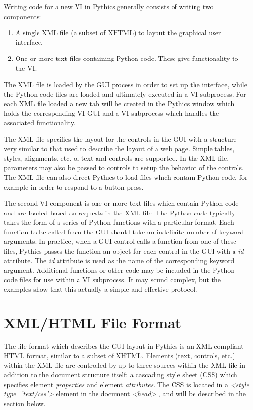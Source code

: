 \documentclass[letterpaper,10pt,english]{sphinxmanual}
\begin{document}
Writing code for a new VI in Pythics generally consists of writing two
components:
\begin{enumerate}
\item {} 
A single XML file (a subset of XHTML) to layout the graphical user interface.

\item {} 
One or more text files containing Python code. These give functionality to
the VI.

\end{enumerate}

The XML file is loaded by the GUI process in order to set up the interface,
while the Python code files are loaded and ultimately executed in a VI
subprocess. For each XML file loaded a new tab will be created in the
Pythics window which holds the corresponding VI GUI and a VI subprocess which
handles the associated functionality.

The XML file specifies the layout for the controls in the GUI with a structure
very similar to that used to describe the layout of a web page. Simple tables,
styles, alignments, etc. of text and controls are supported. In the XML file,
parameters may also be passed to controls to setup the behavior of the
controls. The XML file can also direct Pythics to load files which contain
Python code, for example in order to respond to a button press.

The second VI component is one or more text files which contain Python code
and are loaded based on requests in the XML file. The Python code typically
takes the form of a series of Python functions with a particular format. Each
function to be called from the GUI should take an indefinite number of keyword
arguments. In practice, when a GUI control calls a function from one of these
files, Pythics passes the function an object for each control in the GUI with
a \emph{id} attribute. The \emph{id} attribute is used as the name of the
corresponding keyword argument. Additional functions or other code may be
included in the Python code files for use within a VI subprocess. It may sound
complex, but the examples show that this actually a simple and effective
protocol.


\section{XML/HTML File Format}
\label{programming:xml-html-file-format}
The file format which describes the GUI layout in Pythics is an XML-compliant
HTML format, similar to a subset of XHTML. Elements (text, controls, etc.)
within the XML file are controlled by up to three sources within the XML file
in addition to the document structure itself: a cascading style sheet (CSS)
which specifies element \emph{properties} and element \emph{attributes}. The
CSS is located in a \emph{\textless{}style type='text/css'\textgreater{}} element in the document
\emph{\textless{}head\textgreater{}} , and will be described in the section below.
\end{document}
